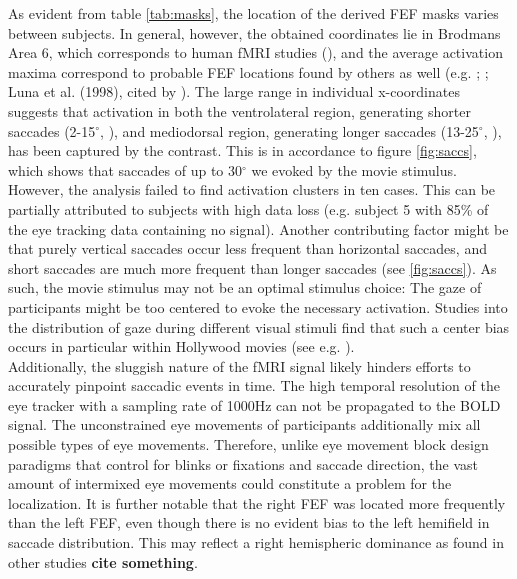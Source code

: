 \documentclass[a4paper, 12pt]{scrreprt}
\begin{document}
As evident from table \ref{tab:masks}, the location of the derived FEF masks varies between subjects. In general, however, the obtained coordinates lie in Brodmans Area 6, which corresponds to human fMRI studies (\cite{vernet2014corrigendum}), and the average activation maxima correspond to probable FEF locations found by others as well (e.g. \cite{paus1996location}; \cite{tehovnik2000eye}; Luna et al. (1998), cited by \textcite{vernet2014corrigendum}). The large range in individual x-coordinates suggests that activation in both the ventrolateral region, generating shorter saccades (2-15$^\circ$, \cite{bruce1985primate}), and mediodorsal region, generating longer saccades (13-25$^\circ$, \cite{bruce1985primate}), has been captured by the contrast. This is in accordance to figure \ref{fig:saccs}, which shows that saccades of up to 30$^\circ$ we evoked by the movie stimulus. \\
However, the analysis failed to find activation clusters in ten cases. This can be partially attributed to subjects with high data loss (e.g. subject 5 with 85\% of the eye tracking data containing no signal). Another contributing factor might be that purely vertical saccades occur less frequent than horizontal saccades, and short saccades are much more frequent than longer saccades (see \ref{fig:saccs}). As such, the movie stimulus may not be an optimal stimulus choice: The gaze of participants might be too centered to evoke the necessary activation. Studies into the distribution of gaze during different visual stimuli find that such a center bias occurs in particular within Hollywood movies (see e.g. \cite{tseng2009quantifying}). \\ Additionally, the sluggish nature of the fMRI signal likely hinders efforts to accurately pinpoint saccadic events in time. The high temporal resolution of the eye tracker with a sampling rate of 1000Hz can not be propagated to the BOLD signal. The unconstrained eye movements of participants additionally mix all possible types of eye movements. Therefore, unlike eye movement block design paradigms that control for blinks or fixations and saccade  direction, the vast amount of intermixed eye movements could constitute a problem for the localization. It is further notable that the right FEF was located more frequently than the left FEF, even though there is no evident bias to the left hemifield in saccade distribution. This may reflect a right hemispheric dominance as found in other studies \textbf{cite something}. \\
\end{document}
